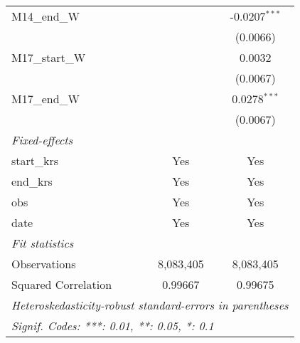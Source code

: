 \documentclass[10pt,a4paper]{article}
\begin{document}
\begin{tabular}{lcc}
   M14\_end\_W                                      &                 & -0.0207$^{***}$\\   
                                                    &                 & (0.0066)\\   
   M17\_start\_W                                    &                 & 0.0032\\   
                                                    &                 & (0.0067)\\   
   M17\_end\_W                                      &                 & 0.0278$^{***}$\\   
                                                    &                 & (0.0067)\\   
   \midrule
   \emph{Fixed-effects}\\
   start\_krs                                       & Yes             & Yes\\  
   end\_krs                                         & Yes             & Yes\\  
   obs                                              & Yes             & Yes\\  
   date                                             & Yes             & Yes\\  
   \midrule
   \emph{Fit statistics}\\
   Observations                                     & 8,083,405       & 8,083,405\\  
   Squared Correlation                              & 0.99667         & 0.99675\\  
   \midrule \midrule
   \multicolumn{3}{l}{\emph{Heteroskedasticity-robust standard-errors in parentheses}}\\
   \multicolumn{3}{l}{\emph{Signif. Codes: ***: 0.01, **: 0.05, *: 0.1}}\\
\end{tabular}
\par\endgroup
\end{document}
